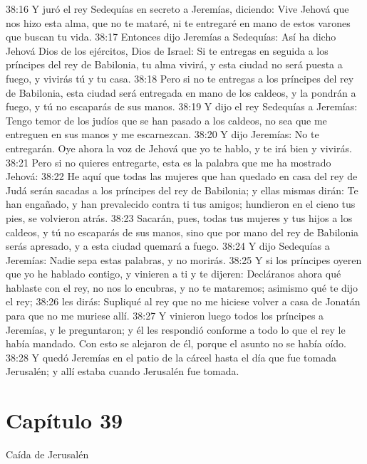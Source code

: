 38:16 Y juró el rey Sedequías en secreto a Jeremías, diciendo: Vive Jehová que nos hizo esta alma, que no te mataré, ni te entregaré en mano de estos varones que buscan tu vida. 
38:17 Entonces dijo Jeremías a Sedequías: Así ha dicho Jehová Dios de los ejércitos, Dios de Israel: Si te entregas en seguida a los príncipes del rey de Babilonia, tu alma vivirá, y esta ciudad no será puesta a fuego, y vivirás tú y tu casa. 
38:18 Pero si no te entregas a los príncipes del rey de Babilonia, esta ciudad será entregada en mano de los caldeos, y la pondrán a fuego, y tú no escaparás de sus manos. 
38:19 Y dijo el rey Sedequías a Jeremías: Tengo temor de los judíos que se han pasado a los caldeos, no sea que me entreguen en sus manos y me escarnezcan. 
38:20 Y dijo Jeremías: No te entregarán. Oye ahora la voz de Jehová que yo te hablo, y te irá bien y vivirás. 
38:21 Pero si no quieres entregarte, esta es la palabra que me ha mostrado Jehová: 
38:22 He aquí que todas las mujeres que han quedado en casa del rey de Judá serán sacadas a los príncipes del rey de Babilonia; y ellas mismas dirán: Te han engañado, y han prevalecido contra ti tus amigos; hundieron en el cieno tus pies, se volvieron atrás. 
38:23 Sacarán, pues, todas tus mujeres y tus hijos a los caldeos, y tú no escaparás de sus manos, sino que por mano del rey de Babilonia serás apresado, y a esta ciudad quemará a fuego. 
38:24 Y dijo Sedequías a Jeremías: Nadie sepa estas palabras, y no morirás. 
38:25 Y si los príncipes oyeren que yo he hablado contigo, y vinieren a ti y te dijeren: Decláranos ahora qué hablaste con el rey, no nos lo encubras, y no te mataremos; asimismo qué te dijo el rey; 
38:26 les dirás: Supliqué al rey que no me hiciese volver a casa de Jonatán para que no me muriese allí. 
38:27 Y vinieron luego todos los príncipes a Jeremías, y le preguntaron; y él les respondió conforme a todo lo que el rey le había mandado. Con esto se alejaron de él, porque el asunto no se había oído. 
38:28 Y quedó Jeremías en el patio de la cárcel hasta el día que fue tomada Jerusalén; y allí estaba cuando Jerusalén fue tomada. 
\section*{Capítulo 39 }
Caída de Jerusalén 
 
